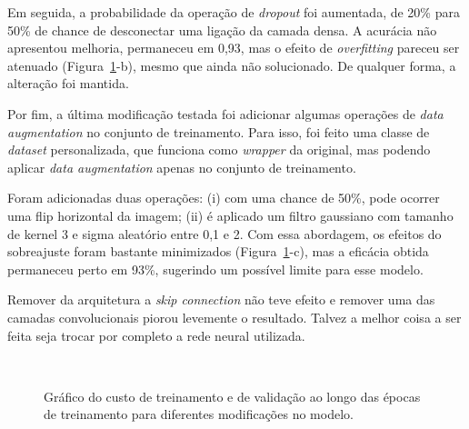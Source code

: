 Em seguida, a probabilidade da operação de \textit{dropout} foi aumentada, de 20\% para 50\% de chance de desconectar uma ligação da camada densa. A acurácia não apresentou melhoria, permaneceu em 0,93, mas o efeito de \textit{overfitting} pareceu ser atenuado (Figura~\ref{fig:intro_conv:train}-b), mesmo que ainda não solucionado. De qualquer forma, a alteração foi mantida.

Por fim, a última modificação testada foi adicionar algumas operações de \textit{data augmentation} no conjunto de treinamento. Para isso, foi feito uma classe de \textit{dataset} personalizada, que funciona como \textit{wrapper} da original, mas podendo aplicar \textit{data augmentation} apenas no conjunto de treinamento.

Foram adicionadas duas operações: (i) com uma chance de 50\%, pode ocorrer uma flip horizontal da imagem; (ii) é aplicado um filtro gaussiano com tamanho de kernel 3 e sigma aleatório entre 0,1 e 2. Com essa abordagem, os efeitos do sobreajuste foram bastante minimizados (Figura~\ref{fig:intro_conv:train}-c), mas a eficácia obtida permaneceu perto em 93\%, sugerindo um possível limite para esse modelo.

Remover da arquitetura a \textit{skip connection} não teve efeito e remover uma das camadas convolucionais piorou levemente o resultado. Talvez a melhor coisa a ser feita seja trocar por completo a rede neural utilizada.



\begin{figure}[!htb]
	\centering
	 \\
	\caption{Gráfico do custo de treinamento e de validação ao longo das épocas de treinamento para diferentes modificações no modelo.}
	\label{fig:intro_conv:train}
\end{figure}